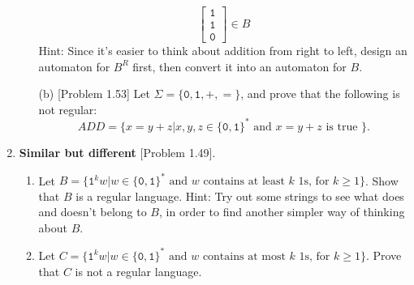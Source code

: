 \documentclass{article}
\newcommand{\s}{\Sigma}
\newcommand{\str}{\texttt}
\newcommand{\newp}{\\[2mm]}
\begin{document}
\begin{enumerate}
\begin{enumerate}
\[        \begin{bmatrix}
        \str{1} \\ \str{1} \\ \str{0}
        \end{bmatrix}
        \in B
        \]
        Hint: Since it’s easier to think about addition from right to left, design an automaton for $B^R$ first, then convert it into an automaton for $B$.\newp
        
        \item [(b)][Problem 1.53] Let $\s = \{\str{0}, \str{1}, +, =\}$, and prove that the following is not regular:
        \[
         ADD = \{x = y+z | x,y,z \in \{\str{0},\str{1}\}^*\text{ and } x=y+z \text{ is true }\}.
        \]
        
    \end{enumerate}
\newpage
    \item \textbf{Similar but different} [Problem 1.49].
    \begin{enumerate}
        \item Let $B = \{\str{1}^kw | w \in\{\str{0}, \str{1}\}^* \text{ and $w$ contains at least $k$ 1s, for } k \geq 1 \}$. Show that $B$ is a regular language. Hint: Try out some strings to see what does and doesn’t belong to $B$, in order to find another simpler way of thinking about $B$.\newp
        
        \item Let $C = \{\str{1}^kw | w \in\{\str{0}, \str{1}\}^* \text{ and $w$ contains at most $k$ 1s, for } k \geq 1 \}$. Prove that $C$ is not a regular language.\newp
        
    \end{enumerate}
\end{enumerate}
\end{document}
